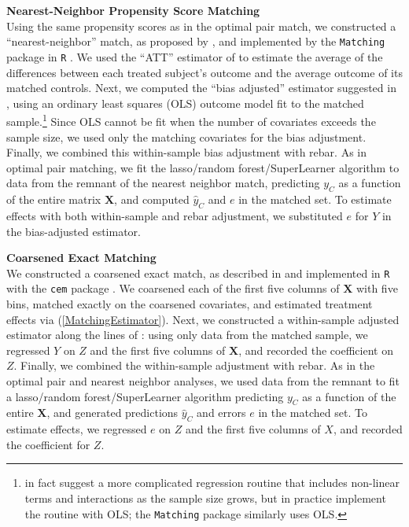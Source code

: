 \documentclass[12pt]{article}\usepackage[]{graphicx}\usepackage[]{color}
\newcommand{\yhat}{\hat{y}_C}
\newcommand{\covMat}{\bm{X}}
\begin{document}
\textbf{Nearest-Neighbor Propensity Score Matching}\\
Using the same propensity scores as in the optimal pair match,
we constructed a ``nearest-neighbor'' match, as proposed by \citet{nearestNeighbor},
and implemented by the \texttt{Matching} package in \texttt{R} \citep{matching}.
We used the ``ATT'' estimator of \citet{nearestNeighbor} to estimate
the average of the differences between each treated subject's outcome
and the average outcome of its matched controls.
Next, we computed the ``bias adjusted'' estimator suggested in
\citet{biasAdjust}, using an ordinary least squares (OLS) outcome model fit
to the matched sample.\footnote{\citet{biasAdjust} in fact suggest a more
  complicated regression routine that includes non-linear terms and
  interactions as the sample size grows, but in practice implement the
  routine with OLS; the \texttt{Matching} package similarly uses OLS.}
Since OLS cannot be fit when the number of covariates exceeds the
sample size, we used only the matching covariates for the bias adjustment.
Finally, we combined this within-sample bias adjustment with rebar.
As in optimal pair matching, we fit the lasso/random
forest/SuperLearner algorithm to data from the remnant
of the nearest neighbor match, predicting $y_C$ as a function of the entire matrix
$\covMat$, and computed $\yhat$ and $e$ in the matched set.
To estimate effects with both within-sample and rebar adjustment, we
substituted $e$ for $Y$ in the bias-adjusted estimator.

\textbf{Coarsened Exact Matching}\\
We constructed a coarsened exact match, as described
in \citet{cem} and implemented in \texttt{R} with the \texttt{cem}
package \citep{cemR}.
We coarsened each of the first five columns of $\covMat$ with five
bins, matched exactly on the coarsened covariates, and estimated
treatment effects via (\ref{MatchingEstimator}).
Next, we constructed a within-sample adjusted estimator along the
lines of \citet{ho2007matching}: using only data from the matched
sample, we regressed $Y$ on $Z$ and the first five
columns of $\covMat$, and recorded the coefficient on $Z$.
Finally, we combined the within-sample adjustment with rebar.
As in the optimal pair and nearest neighbor analyses,
we used data from the remnant to fit a lasso/random
forest/SuperLearner algorithm predicting $y_C$ as
a function of the entire $\covMat$, and generated predictions $\yhat$
and errors $e$ in the matched set.
To estimate effects, we regressed $e$ on $Z$ and the first five
columns of $X$, and recorded the coefficient for $Z$.
\end{document}
